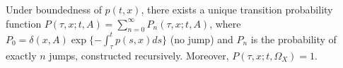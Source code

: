 Under boundedness of $p(t, x)$, there exists a unique transition probability function $P(\tau, x; t, A) = \sum_{n=0}^\infty P_n(\tau, x; t, A)$, where $P_0 = \delta(x, A)\exp\{-\int_\tau^t p(s,x) ds\}$ (no jump) and $P_n$ is the probability of exactly $n$ jumps, constructed recursively. Moreover, $P(\tau, x; t, \Omega_X) = 1$.
